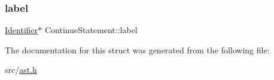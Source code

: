 \subsubsection{\texorpdfstring{label}{label}}
{\footnotesize\ttfamily \hyperlink{struct_identifier}{Identifier}$\ast$ Continue\+Statement\+::label}



The documentation for this struct was generated from the following file\+:\begin{DoxyCompactItemize}
\item 
src/\hyperlink{ast_8h}{ast.\+h}\end{DoxyCompactItemize}
